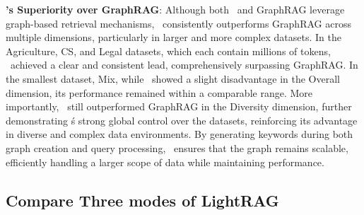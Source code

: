 \textbf{\model's Superiority over GraphRAG}: 
Although both \model\ and GraphRAG leverage graph-based retrieval mechanisms, \model\ consistently outperforms GraphRAG across multiple dimensions, particularly in larger and more complex datasets. In the Agriculture, CS, and Legal datasets, which each contain millions of tokens, \model\ achieved a clear and consistent lead, comprehensively surpassing GraphRAG. In the smallest dataset, Mix, while \model\ showed a slight disadvantage in the Overall dimension, its performance remained within a comparable range. More importantly, \model\ still outperformed GraphRAG in the Diversity dimension, further demonstrating \model\'s strong global control over the datasets, reinforcing its advantage in diverse and complex data environments. By generating keywords during both graph creation and query processing, \model\ ensures that the graph remains scalable, efficiently handling a larger scope of data while maintaining performance.

\subsection{Compare Three modes of LightRAG}

